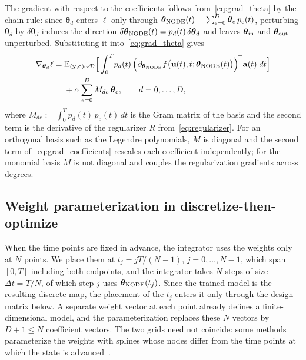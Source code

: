 \documentclass[pdflatex,sn-mathphys-num]{sn-jnl}%
\newcommand{\E}{\mathbb{E}}
\newcommand{\bfu}{\mathbf{u}}
\newcommand{\bfc}{\mathbf{c}}
\newcommand{\bfy}{\mathbf{y}}
\newcommand{\bftheta}{\boldsymbol{\theta}}
\newcommand{\bfa}{\mathbf{a}}
\theoremstyle{thmstyleone}%
\theoremstyle{thmstyletwo}%
\theoremstyle{thmstylethree}%
\begin{document}
The gradient with respect to the coefficients follows from~\eqref{eq:grad_theta} by the chain rule: since $\bftheta_d$ enters $\ell$ only through $\bftheta_{\rm NODE}(t) = \sum_{e=0}^D \bftheta_e\,p_e(t)$, perturbing $\bftheta_d$ by $\delta\bftheta_d$ induces the direction $\delta\bftheta_{\rm NODE}(t) = p_d(t)\,\delta\bftheta_d$ and leaves $\bftheta_{\rm in}$ and $\bftheta_{\rm out}$ unperturbed. Substituting it into~\eqref{eq:grad_theta} gives
\begin{equation}\label{eq:grad_coefficients}
\begin{split}
    \nabla_{\bftheta_d}\ell
    ={}& \E_{(\bfy,\bfc)\sim\mathcal{D}}\Big[\int_{0}^{T}\! p_d(t)\,
    \Big(\partial_{\bftheta_{\rm NODE}} f\big(\bfu(t),t;\bftheta_{\rm NODE}(t)\big)\Big)^{\!\top}\bfa(t)\;dt\Big] \\
    &+ \alpha\sum_{e=0}^{D} M_{de}\,\bftheta_e,
    \qquad d=0,\ldots,D,
\end{split}
\end{equation}
where $M_{de} := \int_0^T p_d(t)\,p_e(t)\,dt$ is the Gram matrix of the basis and the second term is the derivative of the regularizer $R$ from~\eqref{eq:regularizer}.
%
For an orthogonal basis such as the Legendre polynomials, $M$ is diagonal and the second term of~\eqref{eq:grad_coefficients} rescales each coefficient independently; for the monomial basis $M$ is not diagonal and couples the regularization gradients across degrees.

\subsection{Weight parameterization in discretize-then-optimize}\label{subsect:discopt_weightParam}
When the time points are fixed in advance, the integrator uses the weights only at $N$ points. We place them at $t_j = jT/(N-1)$, $j=0,\ldots,N-1$, which span $[0,T]$ including both endpoints, and the integrator takes $N$ steps of size $\Delta t = T/N$, of which step $j$ uses $\bftheta_{\rm NODE}(t_j)$. Since the trained model is the resulting discrete map, the placement of the $t_j$ enters it only through the design matrix below.
%
A separate weight vector at each point already defines a finite-dimensional model, and the parameterization replaces these $N$ vectors by $D+1 \le N$ coefficient vectors.
%
The two grids need not coincide: some methods parameterize the weights with splines whose nodes differ from the time points at which the state is advanced~\cite{Li:2019wr, benning2019deep}.
\end{document}
